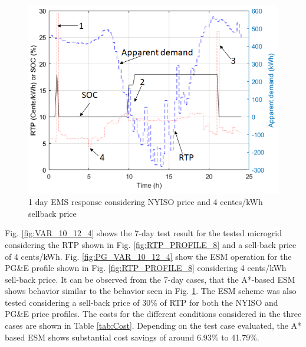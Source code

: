  \begin{figure}[!ht]
    \centering
    \includegraphics[width = \linewidth]{figs/VAR_1_day_example.png}
    \caption{1 day EMS response considering NYISO price and 4 centes/kWh sellback price}
    \label{fig:VAR_1_day_example}
\end{figure}

Fig. \ref{fig:VAR_10_12_4} shows the 7-day test result for the tested microgrid considering the RTP shown in Fig. \ref{fig:RTP_PROFILE_8} and a sell-back price of 4 cents/kWh. Fig. \ref{fig:PG_VAR_10_12_4} show the ESM operation for the PG\&E profile shown in Fig. \ref{fig:RTP_PROFILE_8} considering 4 cents/kWh sell-back price. It can be observed from the 7-day cases, that the A*-based ESM shows behavior similar to the behavior seen in  Fig. \ref{fig:VAR_1_day_example}. The ESM scheme was also tested considering a sell-back price of 30\% of RTP for both the NYISO and PG\&E price profiles. The costs for the different conditions considered in the three cases are shown in Table \ref{tab:Cost}. Depending on the test case evaluated, the A* based ESM shows substantial cost savings of around 6.93\% to 41.79\%. 

